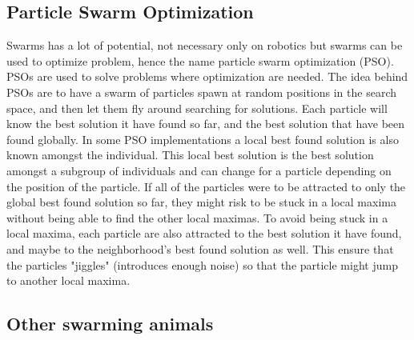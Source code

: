 \subsection{Particle Swarm Optimization}
Swarms has a lot of potential, not necessary only on robotics but swarms can be used to optimize problem, hence the name particle swarm optimization (PSO). PSOs are used to solve problems where optimization are needed. The idea behind PSOs are to have a swarm of particles spawn at random positions in the search space, and then let them fly around searching for solutions. Each particle will know the best solution it have found so far, and the best solution that have been found globally. In some PSO implementations a local best found solution is also known amongst the individual. This local best solution is the best solution amongst a subgroup of individuals and can change for a particle depending on the position of the particle. 
If all of the particles were to be attracted to only the global best found solution so far, they might risk to be stuck in a local maxima without being able to find the other local maximas. To avoid being stuck in a local maxima, each particle are also attracted to the best solution it have found, and maybe to the neighborhood's best found solution as well. This ensure that the particles "jiggles" (introduces enough noise) so that the particle might jump to another local maxima. 

\subsection{Other swarming animals}
